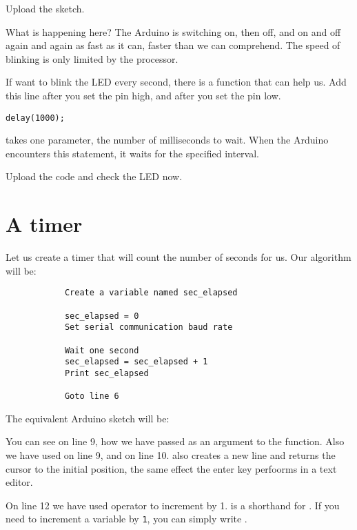 \documentclass{article}
\begin{document}
			Upload the sketch.

			What is happening here? The Arduino is switching on, then off, and on and off again and again as fast as it can, faster than we can comprehend. The speed of blinking is only limited by the processor.

			If want to blink the LED every second, there is a function  that can help us. Add this line after you set the pin high, and after you set the pin low.

			\begin{lstlisting}[numbers = none]
			delay(1000);
			\end{lstlisting}

			 takes one parameter, the number of milliseconds to wait. When the Arduino encounters this statement, it waits for the specified interval. 

			Upload the code and check the LED now.

		\section{A timer}

			Let us create a timer that will count the number of seconds for us. Our algorithm will be:

			\begin{lstlisting}
			Create a variable named sec_elapsed

			sec_elapsed = 0
			Set serial communication baud rate

			Wait one second
			sec_elapsed = sec_elapsed + 1
			Print sec_elapsed

			Goto line 6
			\end{lstlisting}

			The equivalent Arduino sketch will be:

			

			You can see on line 9, how we have passed  as an argument to the  function. Also we have used  on line 9, and  on line 10.  also creates a new line and returns the cursor to the initial position, the same effect the enter key perfoorms in a text editor.

			On line 12 we have used \inlncd{+=} operator to increment  by 1.  is a shorthand for . If you need to increment a variable by \texttt{1}, you can simply write .
\end{document}
